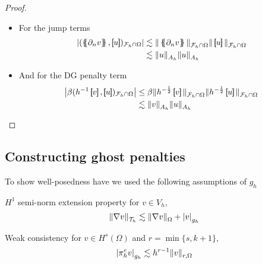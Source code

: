 \begin{proof}
\begin{enumerate}[label=\arabic*)]
\begin{itemize}
        \item For the jump terms \[
                \begin{split}
                    \left\lvert( \mean{ \partial _{n} v }  , \jump{ u }  ) _{\mathcal{F} _{h} \cap \Omega }  \right\rvert &\lesssim  \| \mean{ \partial _{n} v }   \|_{ \mathcal{F}_{h}\cap \Omega   }^{  } \| \jump{ u }   \|_{ \mathcal{F}_{h}\cap
                    \Omega   }^{  } \\
&\lesssim  \| u   \|_{ A_{h}    }^{  } \|  u    \|_{ A_{h}   }^{  }
                \end{split}
        \]

    \item And for the DG penalty term
        \[
            \begin{split}
         \left\lvert \beta ( h^{-1} \jump{ v }  ,
         \jump{ u }  )_{\mathcal{F}_{h}\cap \Omega  } \right\rvert &\le  \beta \| h^{-\frac{1}{2}    }\jump{ v } \|_{ \mathcal{F}_{h} \cap \Omega  }^{  }\| h^{-\frac{1}{2}    }\jump{ u } \|_{\mathcal{F}_{h} \cap \Omega   }^{  } \\
    &\lesssim \| v \|_{A_{h}  }^{  } \| u \|_{A_{h}  }^{  }
            \end{split}
        \]

    \end{itemize}


    \end{enumerate}


\end{proof}


\subsection{Constructing ghost penalties}%
\label{sub:constructing_ghost_penalties}



To show well-posedness have we used the following assumptions of $g_{h}$

\begin{assumption}[EP1]
    \label{as:EP1_2}
    $H^{1}$ semi-norm extension property for $v \in  V_{h}$,  \[
    \| \nabla v \|_{ \mathcal{T} _{h} }^{  }  \lesssim \| \nabla v \|_{ \Omega  }^{  }  + \left\lvert  v  \right\rvert _{g_{h}}
    \]
\end{assumption}

\begin{assumption}[EP2]
    \label{as:EP2}
    Weak consistency for $v \in H^{s}( \Omega ) $ and $r = \min\{s, k+1\} $, \[
    \left\lvert  \pi ^{e}_{h} v  \right\rvert_{g_{h}} \lesssim  h^{r-1} \| v \|_{ r,\Omega  }^{  }
    \]
\end{assumption}

